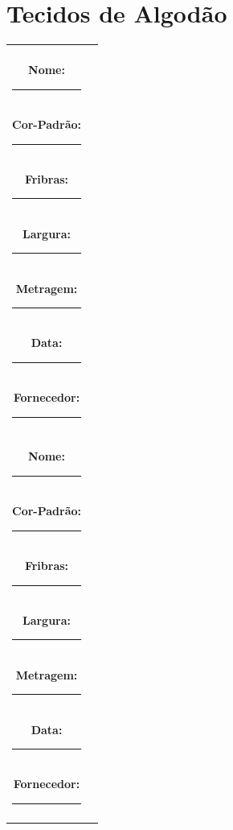 \documentclass[
]{article}
\author{}
\date{\vspace{-2.5em}}
\begin{document}
\section{Tecidos de Algodão}\label{tecidos-de-algoduxe3o}

\begin{center}
\setlength{\tabcolsep}{18pt}
\renewcommand{\arraystretch}{1.2}
\begin{tabular}{cc}

\begin{minipage}[t]{0.42\textwidth}
\small
\fbox{\rule{0pt}{3cm}\rule{5cm}{0pt}} \\[0.2cm]
\textbf{Nome:} \rule{Xcm}{0.4pt} \\
\textbf{Cor-Padrão:} \rule{4.2cm}{0.4pt} \\
\textbf{Fribras:} \rule{4.2cm}{0.4pt} \\
\textbf{Largura:} \rule{4.7cm}{0.4pt} \\
\textbf{Metragem:} \rule{4.5cm}{0.4pt} \\
\textbf{Data:} \rule{5cm}{0.4pt} \\
\textbf{Fornecedor:} \rule{4.3cm}{0.4pt} \\[0.2cm]
\end{minipage}
 & 
\begin{minipage}[t]{0.42\textwidth}
\small
\fbox{\rule{0pt}{3cm}\rule{5cm}{0pt}} \\[0.2cm]
\textbf{Nome:} \rule{Xcm}{0.4pt} \\
\textbf{Cor-Padrão:} \rule{4.2cm}{0.4pt} \\
\textbf{Fribras:} \rule{4.2cm}{0.4pt} \\
\textbf{Largura:} \rule{4.7cm}{0.4pt} \\
\textbf{Metragem:} \rule{4.5cm}{0.4pt} \\
\textbf{Data:} \rule{5cm}{0.4pt} \\
\textbf{Fornecedor:} \rule{4.3cm}{0.4pt} \\[0.2cm]
\end{minipage}
 \\ [1cm]


\end{tabular}
\end{center}
\end{document}
